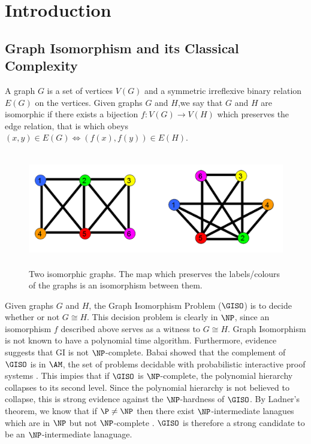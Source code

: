 \documentclass[11pt]{report}
\begin{document}
\tableofcontents






\chapter{Introduction}

\section{Graph Isomorphism and its Classical Complexity}

	A graph $G$ is a set of vertices $V(G)$ and a symmetric irreflexive binary relation $E(G)$ on the vertices. Given graphs $G$ and $H$,we say that $G$ and $H$ are isomorphic if there exists a bijection $f:V(G)\to V(H)$ which preserves the edge relation, that is which obeys $(x,y)\in E(G) \Leftrightarrow (f(x), f(y)) \in E(H)$.

\begin{figure}[b]
\begin{center}
\leavevmode
\includegraphics[height=50mm]{Graph_Isomorphism_v0.png}
\end{center}
\caption{Two isomorphic graphs. The map which preserves the labels/colours of the graphs is an isomorphism between them.}
\label{fig:one}
\end{figure}

Given graphs $G$ and $H$, the Graph Isomorphism Problem ($\GISO$) is to decide whether or not $G \cong H$. This decision problem  is clearly in $\NP$, since an isomorphism $f$ described above serves as a witness to $G\cong H$. Graph Isomorphism is not known to  have a polynomial time algorithm. Furthermore, evidence suggests that GI is not $\NP$-complete. Babai showed that the complement of $\GISO$ is in $\AM$, the set of problems decidable with probabilistic interactive proof systems \cite{Babai1985}. This impies that if $\GISO$ is $\NP$-complete, the polynomial hierarchy collapses to its second level. Since the polynomial hierarchy is not believed to collapse, this is strong evidence against the $\NP$-hardness of $\GISO$. By Ladner's theorem, we know that if $\P \neq \NP$ then there exist $\NP$-intermediate lanagues which are in $\NP$ but not $\NP$-complete \cite{Ladner75}. $\GISO$ is therefore a strong candidate to be an $\NP$-intermediate lanaguage.
\end{document}
